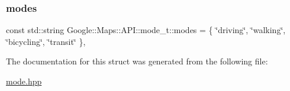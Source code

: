 \mbox{\label{a00044_a752861e4de1fd7afb443595988a86a01}} 
\subsubsection{\texorpdfstring{modes}{modes}}
{\footnotesize\ttfamily const std\+::string Google\+::\+Maps\+::\+A\+P\+I\+::mode\+\_\+t\+::modes = \{ \char`\"{}driving\char`\"{}, \char`\"{}walking\char`\"{}, \char`\"{}bicycling\char`\"{}, \char`\"{}transit\char`\"{} \}\hspace{0.3cm}{\ttfamily [static]}, {\ttfamily [private]}}



The documentation for this struct was generated from the following file\+:\begin{DoxyCompactItemize}
\item 
\hyperlink{a00020}{mode.\+hpp}\end{DoxyCompactItemize}
